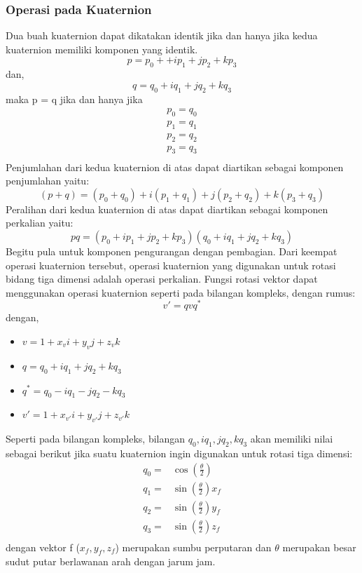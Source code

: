 \subsubsection{Operasi pada Kuaternion}
\label{sssec:operasi_pada_kuaternion}
Dua buah kuaternion dapat dikatakan identik jika dan hanya jika kedua kuaternion memiliki komponen yang identik.
\[
	p = p_0 + +ip_1+jp_2+kp_3
\]
dan,
\[
	q = q_0 + i q_1 + j q_2 + k q_3
\]
maka p = q jika dan hanya jika
\begin{equation}
	\begin{split}
	p_0=q_0\\
	p_1=q_1\\
	p_2=q_2\\
	p_3=q_3\\
	\end{split}
\end{equation}
Penjumlahan dari kedua kuaternion di atas dapat diartikan sebagai komponen penjumlahan yaitu:
\[
	(p+q)=(p_0+q_0)+i(p_1+q_1)+j(p_2+q_2)+k(p_3+q_3)
\]
Peralihan dari kedua kuaternion di atas dapat diartikan sebagai komponen perkalian yaitu:
\[
	pq = (p_0 +ip_1+jp_2+kp_3)(q_0 + i q_1 + j q_2 + k q_3)
\]
Begitu pula untuk komponen pengurangan dengan pembagian. 
Dari keempat operasi kuaternion tersebut, operasi kuaternion yang digunakan untuk rotasi bidang tiga dimensi adalah operasi perkalian. Fungsi rotasi vektor dapat menggunakan operasi kuaternion seperti pada bilangan kompleks, dengan rumus:
\[
	v' = qvq^*
\]
dengan,
\begin{itemize}
	\item \(v = 1 + x_v i +y_v j + z_v k\)
	\item \(q = q_0 + i q_1 + j q_2 + k q_3	\)
	\item \(q^* =  q_0 - i q_1 - j q_2 - k q_3\)
	\item \(v' = 1 + x_{v'} i +y_{v'} j + z_{v'} k\)
\end{itemize}
Seperti pada bilangan kompleks, bilangan $q_0 ,i q_1,j q_2,k q_3$ akan memiliki nilai sebagai berikut jika suatu kuaternion ingin digunakan untuk rotasi tiga dimensi:
\begin{equation}
	\begin{split}
	q_0=& \cos (\frac{\theta}{2})\\
	q_1=& \sin (\frac{\theta}{2}) x_f\\
	q_2=& \sin (\frac{\theta}{2}) y_f\\
	q_3=& \sin (\frac{\theta}{2}) z_f\\
	\end{split}
\end{equation}
dengan vektor f ($x_f,y_f,z_f$) merupakan sumbu perputaran dan $\theta$ merupakan besar sudut putar berlawanan arah dengan jarum jam.


